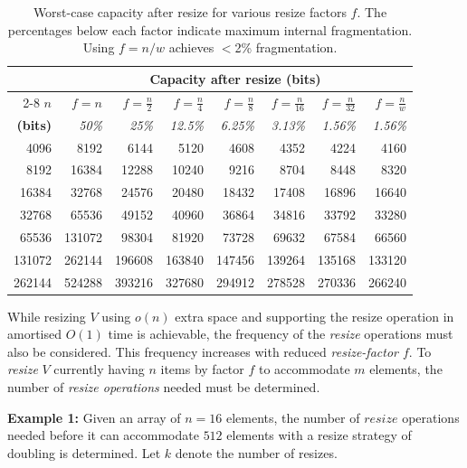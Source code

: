\begin{table}[H]
    \centering
    \footnotesize
    \setlength{\tabcolsep}{4pt}
    \begin{tabular}{r r r r r r r r}
    \toprule
    & \multicolumn{7}{c}{\textbf{Capacity after resize (bits)}} \\
    \cmidrule(l){2-8}
    \textbf{$n$} & \textbf{$f=n$} & \textbf{$f=\frac{n}{2}$} & \textbf{$f=\frac{n}{4}$} & \textbf{$f=\frac{n}{8}$} & \textbf{$f=\frac{n}{16}$} & \textbf{$f=\frac{n}{32}$} & \textbf{$f=\frac{n}{w}$} \\
    \textbf{(bits)} & \textit{50\%} & \textit{25\%} & \textit{12.5\%} & \textit{6.25\%} & \textit{3.13\%} & \textit{1.56\%} & \textit{1.56\%} \\
    \midrule
    4096 & 8192 & 6144 & 5120 & 4608 & 4352 & 4224 & 4160 \\
    8192 & 16384 & 12288 & 10240 & 9216 & 8704 & 8448 & 8320 \\
    16384 & 32768 & 24576 & 20480 & 18432 & 17408 & 16896 & 16640 \\
    32768 & 65536 & 49152 & 40960 & 36864 & 34816 & 33792 & 33280 \\
    65536 & 131072 & 98304 & 81920 & 73728 & 69632 & 67584 & 66560 \\
    131072 & 262144 & 196608 & 163840 & 147456 & 139264 & 135168 & 133120 \\
    262144 & 524288 & 393216 & 327680 & 294912 & 278528 & 270336 & 266240 \\
    \bottomrule
    \end{tabular}
    \caption{Worst-case capacity after resize for various resize factors $f$. The percentages below each factor indicate maximum internal fragmentation. Using $f = n/w$ achieves $<$2\% fragmentation.}
    \label{table:2}
\end{table}
\par 
While resizing $V$ using $o(n)$ extra space and supporting the resize operation in amortised $O(1)$ time is achievable, the frequency of the \textit{resize} operations must also be considered. This frequency increases with reduced \textit{resize-factor $f$}. To \textit{resize} $V$ currently having $n$ items by factor $f$ to accommodate $m$ elements, the number of \textit{resize operations} needed must be determined.
\par
\textbf{Example 1:} Given an array of $n=16$ elements, the number of $resize$ operations needed before it can accommodate $512$ elements with a resize strategy of doubling is determined. Let $k$ denote the number of resizes.
